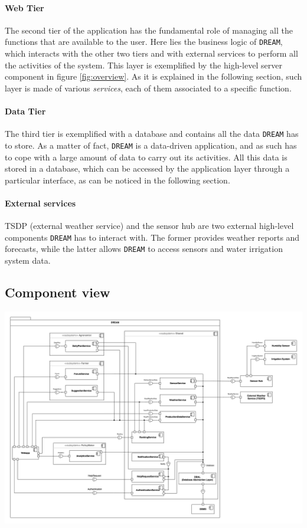 \documentclass{article}
\begin{document}
\paragraph{Web Tier}
The second tier of the application has the fundamental role of managing all the functions that are available to the user. Here lies the business logic of \verb|DREAM|, which interacts with the other two tiers and with external services to perform all the activities of the system. This layer is exemplified by the high-level server component in figure \ref{fig:overview}. As it is explained in the following section, such layer is made of various \textit{services}, each of them associated to a specific function.
\paragraph{Data Tier}
The third tier is exemplified with a database and contains all the data \verb|DREAM| has to store. As a matter of fact, \verb|DREAM| is a data-driven application, and as such has to cope with a large amount of data to carry out its activities. All this data is stored in a database, which can be accessed by the application layer through a particular interface, as can be noticed in the following section.
\paragraph{External services}
TSDP (external weather service) and the sensor hub are two external high-level components \verb|DREAM| has to interact with. The former provides weather reports and forecasts, while the latter allows \verb|DREAM| to access sensors and water irrigation system data. 
\subsection{Component view}\label{Component view}
\includegraphics[width=16.5cm]{diagrams/components_diagram.png}
\end{document}
